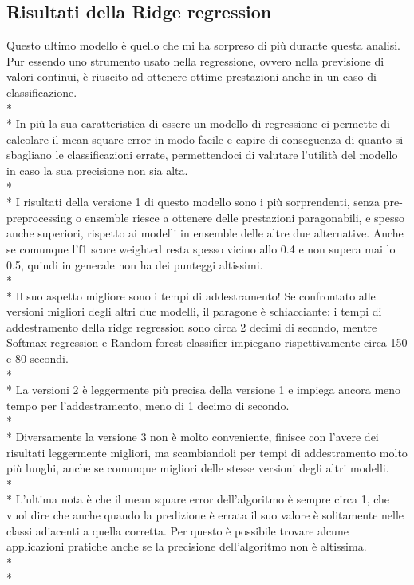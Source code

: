 \subsection{Risultati della Ridge regression}\label{ssec:DecisionRes}
\normalsize
Questo ultimo modello è quello che mi ha sorpreso di più durante questa analisi. Pur essendo uno strumento usato nella regressione, ovvero nella previsione di valori continui, è riuscito ad ottenere ottime prestazioni anche in un caso di classificazione. \\*\\*
In più la sua caratteristica di essere un modello di regressione ci permette di calcolare il mean square error in modo facile e capire di conseguenza di quanto si sbagliano le classificazioni errate, permettendoci di valutare l'utilità del modello in caso la sua precisione non sia alta.\\*\\*
I risultati della versione 1 di questo modello sono i più sorprendenti, senza pre-preprocessing o ensemble riesce a ottenere delle prestazioni paragonabili, e spesso anche superiori, rispetto ai modelli in ensemble delle altre due alternative. Anche se comunque l’f1 score weighted resta spesso vicino allo 0.4 e non supera mai lo 0.5, quindi in generale non ha dei punteggi altissimi.\\*\\*
Il suo aspetto migliore sono i tempi di addestramento! Se confrontato alle versioni migliori degli altri due modelli, il paragone è schiacciante: i tempi di addestramento della ridge regression sono circa 2 decimi di secondo, mentre Softmax regression e Random forest classifier impiegano rispettivamente circa 150 e 80 secondi.\\*\\*
La  versioni 2 è leggermente più precisa della versione 1 e impiega ancora meno tempo per l'addestramento, meno di 1 decimo di secondo.\\*\\*
Diversamente la versione 3 non è molto conveniente, finisce con l'avere dei risultati leggermente migliori, ma scambiandoli per tempi di addestramento molto più lunghi, anche se comunque migliori delle stesse versioni degli altri modelli.\\*\\*
L'ultima nota è che il mean square error dell’algoritmo è sempre circa 1, che vuol dire che anche quando la predizione è errata il suo valore è solitamente nelle classi adiacenti a quella corretta. Per questo è possibile trovare alcune applicazioni pratiche anche se la precisione dell'algoritmo non è altissima.\\*\\*

